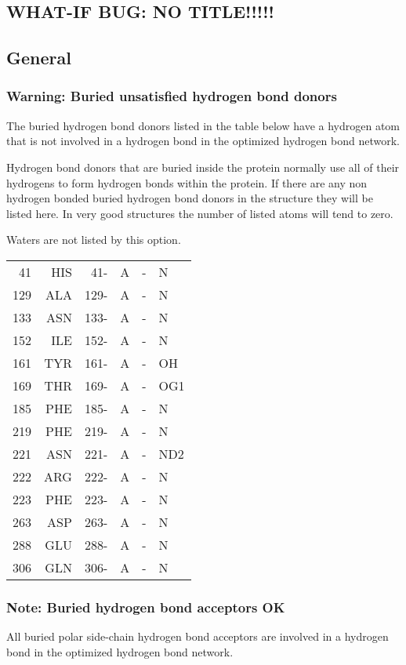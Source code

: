 \documentclass[a4paper]{article}
\def\showsect#1{
  \thesect\gdef\thesect{}
  \thessect\gdef\thessect{}
  \subsubsection{#1}
}
\gdef\thesect{\pagebreak[2]\section{WHAT-IF BUG: NO TITLE!!!!!}}
\gdef\thessect{\subsection{General}}
\begin{document}
\begin{warning}
\showsect{Warning: Buried unsatisfied hydrogen bond donors}
The buried hydrogen bond donors listed in the table below have a hydrogen
atom that is not involved in a hydrogen bond in the optimized hydrogen bond
network.
 
Hydrogen bond donors that are buried inside the protein normally use all of
their hydrogens to form hydrogen bonds within the protein. If there are any
non hydrogen bonded buried hydrogen bond donors in the structure they will
be listed here. In very good structures the number of listed atoms will tend
to zero.
 
Waters are not listed by this option.
 
\begin{center}
 
\begin{supertabular}{rr@{ (}r@{) }rll}
   41&HIS &  41-&A &- &  N\\
  129&ALA & 129-&A &- &  N\\
  133&ASN & 133-&A &- &  N\\
  152&ILE & 152-&A &- &  N\\
  161&TYR & 161-&A &- &  OH\\
  169&THR & 169-&A &- &  OG1\\
  185&PHE & 185-&A &- &  N\\
  219&PHE & 219-&A &- &  N\\
  221&ASN & 221-&A &- &  ND2\\
  222&ARG & 222-&A &- &  N\\
  223&PHE & 223-&A &- &  N\\
  263&ASP & 263-&A &- &  N\\
  288&GLU & 288-&A &- &  N\\
  306&GLN & 306-&A &- &  N\\
\end{supertabular}\end{center}
\end{warning}

\begin{note}
\showsect{Note: Buried hydrogen bond acceptors OK}
All buried polar side-chain hydrogen bond acceptors are involved in a
hydrogen bond in the optimized hydrogen bond network.
\end{note}
\end{document}
